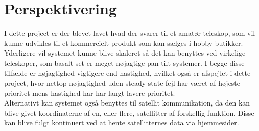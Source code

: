 \section{Perspektivering}

I dette project er der blevet lavet hvad der svarer til et amatør teleskop, som vil kunne udvikles til et kommercielt produkt som kan sælges i hobby butikker. Yderligere vil systemet kunne blive skaleret så det kan benyttes ved virkelige teleskoper, som basalt set er meget nøjagtige pan-tilt-systemer. I begge disse tilfælde er nøjagtighed vigtigere end hastighed, hvilket også er afspejlet i dette project, hvor nettop nøjagtighed uden steady state fejl har været af højeste prioritet mens hastighed har har langt lavere prioritet.
\\
Alternativt kan systemet også benyttes til satellit kommunikation, da den kan blive givet koordinaterne af en, eller flere, satellitter af forskellig funktion. Disse kan blive fulgt kontinuert ved at hente satellitternes data via hjemmesider.